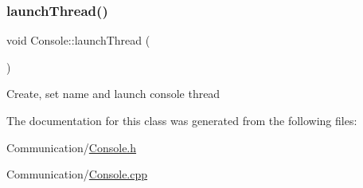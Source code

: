 \subsubsection{\texorpdfstring{launch\+Thread()}{launchThread()}}
{\footnotesize\ttfamily void Console\+::launch\+Thread (\begin{DoxyParamCaption}{ }\end{DoxyParamCaption})}

Create, set name and launch console thread 

The documentation for this class was generated from the following files\+:\begin{DoxyCompactItemize}
\item 
Communication/\mbox{\hyperlink{_console_8h}{Console.\+h}}\item 
Communication/\mbox{\hyperlink{_console_8cpp}{Console.\+cpp}}\end{DoxyCompactItemize}
